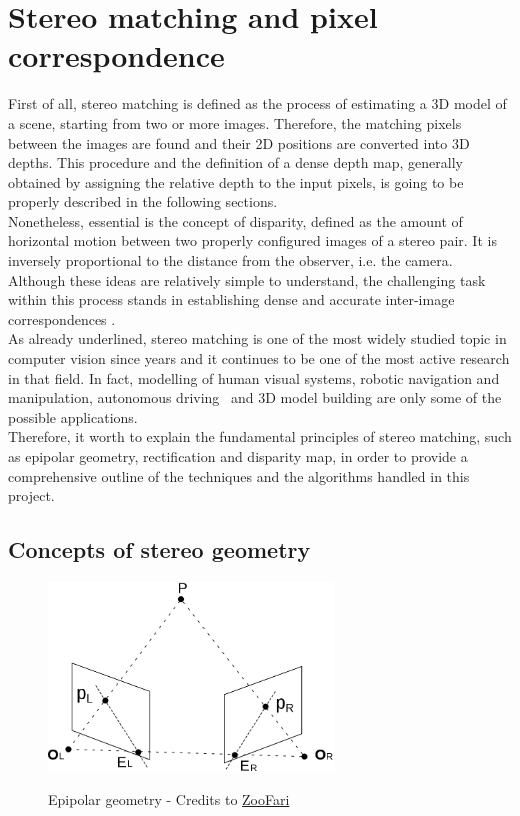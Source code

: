 \section{Stereo matching and pixel correspondence}
\label{section:stereo-match-and-corr}

First of all, stereo matching is defined as the process of estimating a 3D model of a scene, starting from two or more images. 
Therefore, the matching pixels between the images are found and their 2D positions are converted into 3D depths. 
This procedure and the definition of a dense depth map, generally obtained by assigning the relative depth to the input pixels, is going to be properly described in the following sections.\\
Nonetheless, essential is the concept of disparity, defined as the amount of horizontal motion between two properly configured images of a stereo pair. 
It is inversely proportional to the distance from the observer, i.e. the camera. 
Although these ideas are relatively simple to understand, the challenging task within this process stands in establishing dense and accurate inter-image correspondences \cite{Szeliski2011}.\\
As already underlined, stereo matching is one of the most widely studied topic in computer vision since years and it continues to be one of the most active research in that field. 
In fact, modelling of human visual systems, robotic navigation and manipulation, autonomous driving~\cite{Poggi2019} and 3D model building are only some of the possible applications.\\
Therefore, it worth to explain the fundamental principles of stereo matching, such as epipolar geometry, rectification and disparity map, in order to provide a comprehensive outline of the techniques and the algorithms handled in this project.

\subsection{Concepts of stereo geometry}
\label{subsection:stereo-geometry-basics}

\begin{figure}[t]
	\begin{center}
		{\includegraphics[width=.8\textwidth, height=5cm, keepaspectratio]{images/epipolar-geometry}}
\caption{Epipolar geometry - Credits to \href{https://commons.wikimedia.org/wiki/File:Epipolar_Geometry1.svg}{ZooFari}}
\label{fig:epipolargeom}
	\end{center}
\end{figure}

